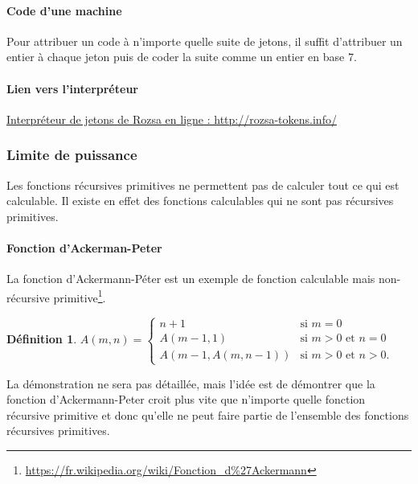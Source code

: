 \documentclass{book}
\theoremstyle{definition}
\newtheorem{definition}{Définition}
\numberwithin{lemma}{subsection}
\numberwithin{theorem}{subsection}
\numberwithin{definition}{subsection}
\numberwithin{proposition}{subsection}
\numberwithin{corollary}{subsection}
\numberwithin{property}{subsection}
\numberwithin{example}{subsection}
\numberwithin{heuristique}{subsection}
\numberwithin{scenario}{subsection}
\begin{document}
            \paragraph{Code d'une machine}
        
                Pour attribuer un code à n'importe quelle suite de jetons, il suffit d'attribuer un entier à chaque jeton puis de coder la suite comme un entier en base 7.    
        
            \paragraph{Lien vers l'interpréteur} \href{http://rozsa-tokens.info/}{Interpréteur de jetons de Rozsa en ligne : http://rozsa-tokens.info/}
            
             \subsubsection{Limite de puissance}
                
                Les fonctions récursives primitives ne permettent pas de calculer tout ce qui est calculable. Il existe en effet des fonctions calculables qui ne sont pas récursives primitives.
                
                \paragraph{Fonction d'Ackerman-Peter}
                
                La fonction d'Ackermann-Péter est un exemple de fonction calculable mais non-récursive primitive\footnote{\url{https://fr.wikipedia.org/wiki/Fonction\_d\%27Ackermann}}.
                \begin{definition}
                $A(m, n) = 
                  \begin{cases}
                     n+1 & \mbox{si } m = 0 \\
                     A(m-1, 1) & \mbox{si } m > 0 \mbox{ et } n = 0 \\
                     A(m-1, A(m, n-1)) & \mbox{si } m > 0 \mbox{ et } n > 0.
                  \end{cases}$
                \end{definition}
                
                La démonstration ne sera pas détaillée, mais l'idée est de démontrer que la fonction d'Ackermann-Peter croit plus vite que n'importe quelle fonction récursive primitive et donc qu'elle ne peut faire partie de l'ensemble des fonctions récursives primitives.
            
\end{document}
